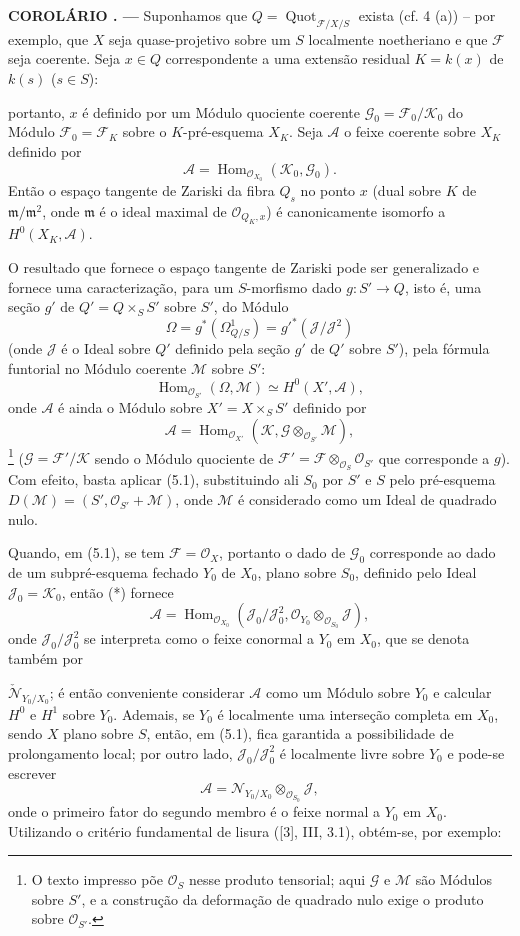 \documentclass[11pt,twoside,openany]{book}
\numberwithin{equation}{section}
\newcommand{\src}[1]{%
  \phantomsection\hypertarget{src:#1}{}%
  \marginpar{\raggedleft\footnotesize\sffamily #1}%
}
\theoremstyle{plain}
\theoremstyle{definition}
\theoremstyle{remark}
\newcommand{\result}[2]{%
  \par\medskip\noindent\textbf{#1%
  \if\relax\detokenize{#2}\relax\else\space#2\fi. ---}\enspace
}
\newcommand{\FgaUnitKey}{frontmatter}
\renewcommand{\src}[1]{%
  \phantomsection\hypertarget{src:\FgaUnitKey:#1}{}%
  \marginpar{\raggedleft\footnotesize\sffamily #1}%
}
\begin{document}
\result{COROLÁRIO}{5.3} Suponhamos que
$Q=\operatorname{Quot}_{\mathcal F/X/S}$ exista (cf. 4 (a)) -- por exemplo,
que $X$ seja quase-projetivo sobre um $S$ localmente noetheriano e que
$\mathcal F$ seja coerente. Seja $x\in Q$ correspondente a uma extensão
residual $K=k(x)$ de $k(s)$ ($s\in S$):
\src{270}
portanto, $x$ é definido por um Módulo quociente coerente
$\mathcal G_0=\mathcal F_0/\mathcal K_0$ do Módulo
$\mathcal F_0=\mathcal F_K$ sobre o $K$-pré-esquema $X_K$. Seja $\mathcal A$
o feixe coerente sobre $X_K$ definido por
\[
\mathcal A=\operatorname{Hom}_{\mathcal O_{X_0}}(\mathcal K_0,\mathcal G_0).
\]
Então o espaço tangente de Zariski da fibra $Q_s$ no ponto $x$ (dual sobre
$K$ de $\mathfrak m/\mathfrak m^2$, onde $\mathfrak m$ é o ideal maximal de
$\mathcal O_{Q_K,x}$) é canonicamente isomorfo a $H^0(X_K,\mathcal A)$.

O resultado que fornece o espaço tangente de Zariski pode ser generalizado e
fornece uma caracterização, para um $S$-morfismo dado
$g:S'\longrightarrow Q$, isto é, uma seção $g'$ de $Q'=Q\times_SS'$ sobre
$S'$, do Módulo
\[
\Omega=g^*(\Omega^1_{Q/S})=g'^*(\mathcal J/\mathcal J^2)
\]
(onde $\mathcal J$ é o Ideal sobre $Q'$ definido pela seção $g'$ de $Q'$ sobre
$S'$), pela fórmula funtorial no Módulo coerente $\mathcal M$ sobre $S'$:
\[
\operatorname{Hom}_{\mathcal O_{S'}}(\Omega,\mathcal M)
\simeq H^0(X',\mathcal A),
\]
onde $\mathcal A$ é ainda o Módulo sobre $X'=X\times_SS'$ definido por
\[
\mathcal A=\operatorname{Hom}_{\mathcal O_{X'}}
(\mathcal K,\mathcal G\otimes_{\mathcal O_{S'}}\mathcal M),
\]
\footnote{O texto impresso põe $\mathcal O_S$ nesse produto tensorial; aqui
$\mathcal G$ e $\mathcal M$ são Módulos sobre $S'$, e a construção da
deformação de quadrado nulo exige o produto sobre $\mathcal O_{S'}$.}
($\mathcal G=\mathcal F'/\mathcal K$ sendo o Módulo quociente de
$\mathcal F'=\mathcal F\otimes_{\mathcal O_S}\mathcal O_{S'}$ que corresponde
a $g$). Com efeito, basta aplicar (5.1), substituindo ali $S_0$ por $S'$ e $S$
pelo pré-esquema $D(\mathcal M)=(S',\mathcal O_{S'}+\mathcal M)$, onde
$\mathcal M$ é considerado como um Ideal de quadrado nulo.

Quando, em (5.1), se tem $\mathcal F=\mathcal O_X$, portanto o dado de
$\mathcal G_0$ corresponde ao dado de um subpré-esquema fechado $Y_0$ de
$X_0$, plano sobre $S_0$, definido pelo Ideal
$\mathcal J_0=\mathcal K_0$, então (*) fornece
\[
\mathcal A=\operatorname{Hom}_{\mathcal O_{X_0}}
(\mathcal J_0/\mathcal J_0^2,
\mathcal O_{Y_0}\otimes_{\mathcal O_{S_0}}\mathcal J),
\]
onde $\mathcal J_0/\mathcal J_0^2$ se interpreta como o feixe conormal a $Y_0$ em
$X_0$, que se denota também por
\src{271}
$\check{\mathcal N}_{Y_0/X_0}$; é então conveniente considerar $\mathcal A$
como um Módulo sobre $Y_0$ e calcular $H^0$ e $H^1$ sobre $Y_0$. Ademais, se
$Y_0$ é localmente uma interseção completa em $X_0$, sendo $X$ plano sobre
$S$, então, em (5.1), fica garantida a possibilidade de prolongamento local;
por outro lado, $\mathcal J_0/\mathcal J_0^2$ é localmente livre sobre $Y_0$ e
pode-se escrever
\[
\mathcal A=\mathcal N_{Y_0/X_0}\otimes_{\mathcal O_{S_0}}\mathcal J,
\]
onde o primeiro fator do segundo membro é o feixe normal a $Y_0$ em $X_0$.
Utilizando o critério fundamental de lisura ([3], III, 3.1), obtém-se, por
exemplo:
\end{document}
